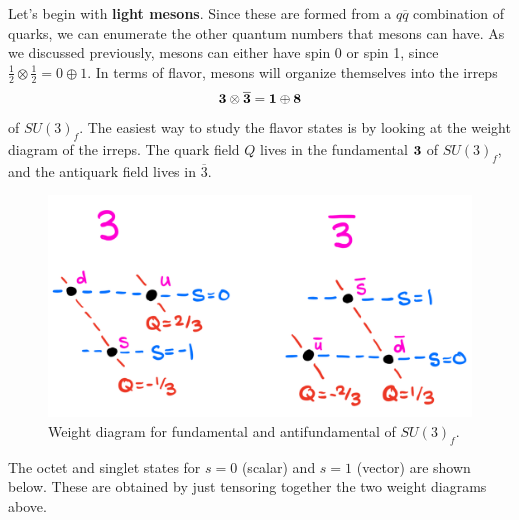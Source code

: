 \documentclass[11pt, oneside]{article}   	%
\theoremstyle{definition}
\numberwithin{equation}{subsection}		%
\begin{document}
Let's begin with \textbf{light mesons}. Since these are formed from a $q\overline q$ combination of quarks, we can enumerate the other quantum 
numbers that mesons can have. As we discussed previously, mesons can either have spin 0 or spin 1, since $\frac{1}{2}\otimes\frac{1}{2} = 0\oplus 1$. 
In terms of flavor, mesons will organize themselves into the irreps 
\begin{equation}
	\bf 3\otimes\overline{3} = 1\oplus 8
\end{equation}
of $SU(3)_f$. The easiest way to study the flavor states is by looking at the weight diagram of the irreps. The quark field $Q$ lives 
in the fundamental $\bf 3$ of $SU(3)_f$, and the antiquark field lives in $\overline 3$. 
\begin{figure}[H]
	\centering
	\includegraphics[width = .5\textwidth]{quark_weights}
	\caption{Weight diagram for fundamental and antifundamental of $SU(3)_f$.}
\end{figure}
The octet and singlet states for $s = 0$ (scalar) and $s = 1$ (vector) are shown below. These are obtained by just tensoring together 
the two weight diagrams above.
\end{document}
